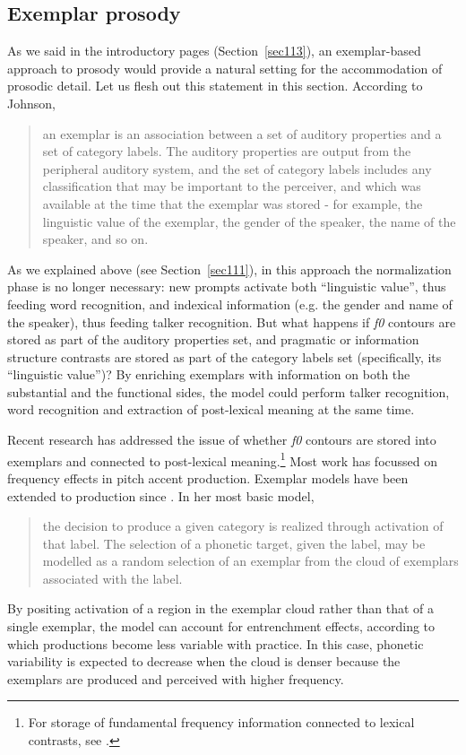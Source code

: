 \subsection{Exemplar prosody}\label{sec631}
As we said in the introductory pages (Section~\ref{sec113}), an exemplar-based approach to prosody would provide a natural setting for the accommodation of prosodic detail. Let us flesh out this statement in this section. According to Johnson, \begin{quote}an exemplar is an association between a set of auditory properties and a set of category labels. The auditory properties are output from the peripheral auditory system, and the set of category labels includes any classification that may be important to the perceiver, and which was available at the time that the exemplar was stored - for example, the linguistic value of the exemplar, the gender of the speaker, the name of the speaker, and so on. \cite[147]{johnson1997speech}\end{quote}
As we explained above (see Section~\ref{sec111}), in this approach the normalization phase is no longer necessary: new prompts activate both ``linguistic value'', thus feeding word recognition, and indexical information (e.g. the gender and name of the speaker), thus feeding talker recognition. But what happens if \textit{f0} contours are stored as part of the auditory properties set, and pragmatic or information structure contrasts are stored as part of the category labels set (specifically, its ``linguistic value'')? By enriching exemplars with information on both the substantial and the functional sides, the model could perform talker recognition, word recognition and extraction of post-lexical meaning at the same time.

Recent research has addressed the issue of whether \textit{f0} contours are stored into exemplars and connected to post-lexical meaning.\footnote{For storage of fundamental frequency information connected to lexical contrasts, see \citet{sekiguchi2006effects}.} Most work has focussed on frequency effects in pitch accent production. Exemplar models have been extended to production since \citet{pierrehumbert2001exemplar}. In her most basic model, \begin{quote}the decision to produce a given category is realized through activation of that label. The selection of a phonetic target, given the label, may be modelled as a random selection of an exemplar from the cloud of exemplars associated with the label.\cite[§3.1]{pierrehumbert2001exemplar}\end{quote}
By positing activation of a region in the exemplar cloud rather than that of a single exemplar, the model can account for entrenchment effects, according to which productions become less variable with practice. In this case, phonetic variability is expected to decrease when the cloud is denser because the exemplars are produced and perceived with higher frequency.

